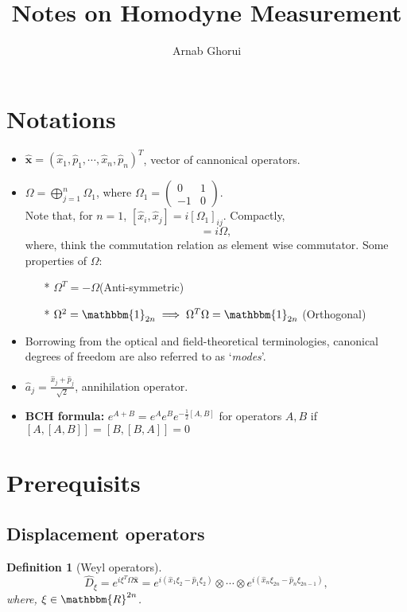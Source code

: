 \documentclass[english,10pt,a4paper]{article}
\title{Notes on Homodyne Measurement}
\author{Arnab Ghorui}
\newtheorem{definition}{Definition}
\newcommand{\xx}{\hat{\textbf{x}}}
\newcommand{\dd}[1]{\hat{D}_{#1}}
\newcommand{\half}{\frac{1}{2}}
\begin{document}
	\maketitle
	
	\section{Notations}
	\begin{itemize}
		\item $\xx= (\hat x_1, \hat p_1,\cdots,\hat x_n, \hat p_n)^T$, vector of cannonical operators.
		\item $\Omega = \bigoplus_{j=1}^n \Omega_1$, where $\Omega_1 = \begin{pmatrix}
			0 & 1 \\ -1 & 0
		\end{pmatrix}$.\\
		Note that, for $n=1$, $[\hat x_i,\hat x_j] = i[\Omega_1]_{ij}$. Compactly, 
		\begin{equation}
			[\xx, \xx^T] = i\Omega, \tag{Canonical Commutation Relation}
		\end{equation}
		 where, think the commutation relation as element wise commutator. Some properties of $\Omega$:
		 \begin{itemize}
		 	\item[*] $\Omega^T=-\Omega$(Anti-symmetric)
		 	\item[*] $\Omega^2 = \mathbbm{1}_{2n} \implies \Omega^T\Omega=\mathbbm{1}_{2n}$ (Orthogonal)
		 \end{itemize}
		\item Borrowing from the optical and field-theoretical terminologies, canonical degrees	of freedom are also referred to as ‘\textit{modes}’.
		\item $\hat a_j = \frac{\hat x_j + \hat p_j}{\sqrt 2}$, annihilation operator.
		\item \textbf{BCH formula: }$e^{A+B}=e^A e^B e^{-\half[A,B]}$	for operators $A,B$ if $[A,[A,B]]=[B,[B,A]]=0$
	\end{itemize}
	
	\section{Prerequisits}
	\subsection{Displacement operators}
	\label{sec:displacement_operators}
	\begin{definition}[Weyl operators]
		\begin{equation}
			\dd{\xi} =e^{i \xi^T \Omega \xx} = e^{i(\hat{x}_1\xi_2-\hat{p}_1\xi_2)}\otimes\cdots\otimes e^{i(\hat{x}_n\xi_{2n}-\hat{p}_n\xi_{2n-1})},
		\end{equation}
		where, $\xi \in \mathbbm{R}^{2n}$.
	\end{definition}
	
\end{document}
